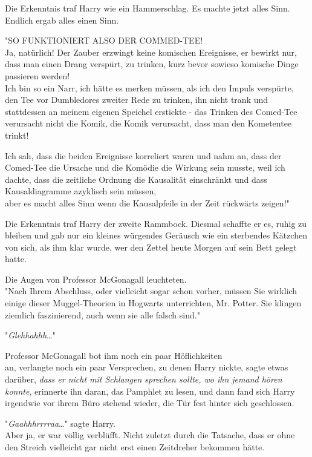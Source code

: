 {Die Erkenntnis traf Harry wie ein Hammerschlag. Es machte jetzt alles Sinn.\\ Endlich ergab alles einen Sinn.

"SO FUNKTIONIERT ALSO DER COMMED-TEE!\\ Ja, natürlich! Der Zauber erzwingt keine komischen Ereignisse, er bewirkt nur, dass man einen Drang verspürt, zu trinken, kurz bevor sowieso komische Dinge passieren werden!\\ Ich bin so ein Narr, ich hätte es merken müssen, als ich den Impuls verspürte, den Tee vor Dumbledores zweiter Rede zu trinken, ihn nicht trank und stattdessen an meinem eigenen Speichel erstickte - das Trinken des Comed-Tee verursacht nicht die Komik, die Komik verursacht, dass man den Kometentee trinkt!

Ich sah, dass die beiden Ereignisse korreliert waren und nahm an, dass der Comed-Tee die Ursache und die Komödie die Wirkung sein musste, weil ich dachte, dass die zeitliche Ordnung die Kausalität einschränkt und dass Kausaldiagramme azyklisch sein müssen,\\ aber es macht alles Sinn wenn die Kausalpfeile in der Zeit rückwärts zeigen!"

Die Erkenntnis traf Harry der zweite Rammbock. Diesmal schaffte er es, ruhig zu bleiben und gab nur ein kleines würgendes Geräusch wie ein sterbendes Kätzchen von sich, als ihm klar wurde, wer den Zettel heute Morgen auf sein Bett gelegt hatte.

Die Augen von Professor McGonagall leuchteten.\\ "Nach Ihrem Abschluss, oder vielleicht sogar schon vorher, müssen Sie wirklich einige dieser Muggel-Theorien in Hogwarts unterrichten, Mr. Potter. Sie klingen ziemlich faszinierend, auch wenn sie alle falsch sind."

"\emph{Glehhahhh}…"

Professor McGonagall bot ihm noch ein paar Höflichkeiten\\ an, verlangte noch ein paar Versprechen, zu denen Harry nickte, sagte etwas darüber, \emph{dass er nicht mit Schlangen sprechen sollte, wo ihn jemand hören konnte}, erinnerte ihn daran, das Pamphlet zu lesen, und dann fand sich Harry irgendwie vor ihrem Büro stehend wieder, die Tür fest hinter sich geschlossen.

"\emph{Gaahhhrrrraa}…" sagte Harry.\\ Aber ja, er war völlig verblüfft. Nicht zuletzt durch die Tatsache, dass er ohne den Streich vielleicht gar nicht erst einen Zeitdreher bekommen hätte.

}
